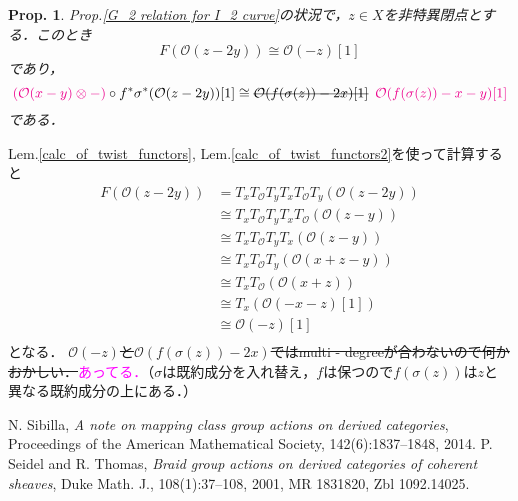 \documentclass[uplatex,a4paper,11pt]{jsarticle}
\makeatletter
\theoremstyle{mystyle} %
\newtheorem{proposition}{Prop.}[section]
\renewenvironment{proof}[1][\proofname]{\par
 \pushQED{\qed}%
 \normalfont \topsep6\p@\@plus6\p@\relax
 \trivlist
 \item[\hskip\labelsep
 \itshape
 {\bf\underline{#1}}]\ignorespaces
}{%
 \popQED\endtrivlist\@endpefalse
}
\makeatother
\begin{document}
\begin{proposition}
	Prop.\ref{G_2 relation for I_2 curve}の状況で，$z \in X$を非特異閉点とする．このとき
	$$F(\mathcal{O}(z - 2y))\cong \mathcal{O}( - z)[1]$$であり，$$\textcolor{magenta}{(\mathcal{O}(x - y)\otimes - )}\circ f^*\sigma^*(\mathcal{O}(z - 2y))[1]\cong \hbox{\sout{$\mathcal{O}(f(\sigma(z)) - 2x)[1]$}}\hspace{5pt}\textcolor{magenta}{\mathcal{O}(f(\sigma(z)) - x - y)[1]}$$である．
\end{proposition}
\begin{proof}
	Lem.\ref{calc_of_twist_functors},
	Lem.\ref{calc_of_twist_functors2}を使って計算すると
	\begin{align}
		F(\mathcal{O}(z - 2y))
		 & = T_xT_\mathcal{O}T_yT_xT_\mathcal{O}T_y(\mathcal{O}(z - 2y)) \\
		 & \cong T_xT_\mathcal{O}T_yT_xT_\mathcal{O}(\mathcal{O}(z - y)) \\
		 & \cong T_xT_\mathcal{O}T_yT_x(\mathcal{O}(z - y))              \\
		 & \cong T_xT_\mathcal{O}T_y(\mathcal{O}(x + z - y))             \\
		 & \cong T_xT_\mathcal{O}(\mathcal{O}(x + z))                    \\
		 & \cong T_x(\mathcal{O}( - x - z)[1])                           \\
		 & \cong \mathcal{O}( - z)[1]                                    \\
	\end{align}
	となる．
\end{proof}
\sout{$\mathcal{O}( - z)$と$\mathcal{O}(f(\sigma(z)) - 2x)$ではmulti - degreeが合わないので何かおかしい．}\textcolor{magenta}{あってる．}（$\sigma$は既約成分を入れ替え，$f$は保つので$f(\sigma(z))$は$z$と異なる既約成分の上にある．）
\begin{comment}

\end{comment}
\begin{thebibliography}{99}
	 N. Sibilla, \textit{A note on mapping class group actions on derived categories}, Proceedings of the American Mathematical Society, 142(6):1837–1848, 2014.
	 P. Seidel and R. Thomas, \textit{Braid group actions on derived categories of coherent sheaves}, Duke Math. J., 108(1):37–108, 2001, MR 1831820, Zbl 1092.14025.
\end{thebibliography}
\end{document}
